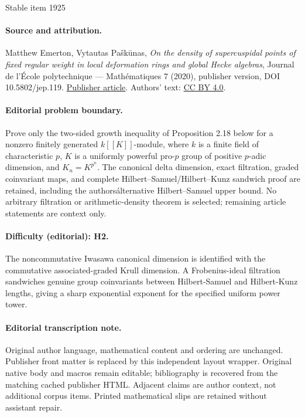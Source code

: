 \documentclass[11pt]{article}
\theoremstyle{definition}
\begin{document}
\begin{center}{\Large Stable item 1925}\end{center}
\paragraph{Source and attribution.}
Matthew Emerton, Vytautas Paškūnas, \emph{On the density of supercuspidal points of fixed regular weight in local deformation rings and global Hecke algebras}, Journal de l’École polytechnique — Mathématiques 7 (2020), publisher version, DOI 10.5802/jep.119. \href{https://jep.centre-mersenne.org/articles/10.5802/jep.119/}{Publisher article}. Authors' text: \href{https://creativecommons.org/licenses/by/4.0/}{CC BY 4.0}.
\paragraph{Editorial problem boundary.}
Prove only the two-sided growth inequality of Proposition 2.18 below for a nonzero finitely generated \(k[[K]]\)-module, where \(k\) is a finite field of characteristic \(p\), \(K\) is a uniformly powerful pro-\(p\) group of positive \(p\)-adic dimension, and \(K_n=K^{p^n}\). The canonical delta dimension, exact filtration, graded coinvariant maps, and complete Hilbert--Samuel/Hilbert--Kunz sandwich proof are retained, including the authors\' alternative Hilbert--Samuel upper bound. No arbitrary filtration or arithmetic-density theorem is selected; remaining article statements are context only.
\paragraph{Difficulty (editorial): H2.}
The noncommutative Iwasawa canonical dimension is identified with the commutative associated-graded Krull dimension. A Frobenius-ideal filtration sandwiches genuine group coinvariants between Hilbert-Samuel and Hilbert-Kunz lengths, giving a sharp exponential exponent for the specified uniform power tower.
\paragraph{Editorial transcription note.}
Original author language, mathematical content and ordering are unchanged. Publisher front matter is replaced by this independent layout wrapper. Original native body and macros remain editable; bibliography is recovered from the matching cached publisher HTML. Adjacent claims are author context, not additional corpus items. Printed mathematical slips are retained without assistant repair.
\clearpage
\end{document}
